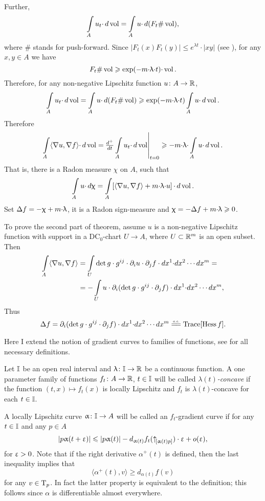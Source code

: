 \documentclass[oneside,a4paper]{article}
\begin{document}
Further,
$$\int\limits_A u_t{\cdot} \,d\mathop{\rm vol}\nolimits=\int\limits_A u{\cdot} \,d(F_t\#\mathop{\rm vol}\nolimits),$$ 
where $\#$ stands for push-forward. 
Since $|F_t(x)F_t(y)|\le e^{\lambda t}{\cdot}|x y|$  
(see \cite[2.1.4(i)]{petrunin:survey}), 
for any $x,y\in A$ we have
$$F_t\#\mathop{\rm vol}\nolimits\geqslant \exp(-m{\cdot}\uplambda{\cdot} t){\cdot}\mathop{\rm vol}\nolimits.$$
Therefore, for any non-negative Lipschitz function $u\colon A\to\mathbb{R}$,
$$\int\limits_A u_t{\cdot}\,d\mathop{\rm vol}\nolimits
=
\int\limits_A u{\cdot}\,d (F_t\#\mathop{\rm vol}\nolimits)
\geqslant
\exp(-m{\cdot}\uplambda{\cdot} t)\int\limits_A u{\cdot}\,d\mathop{\rm vol}\nolimits.$$
Therefore
$$\int\limits_A\langle\nabla u,\nabla f\rangle{\cdot}\,d\mathop{\rm vol}\nolimits 
=
\!\left.\tfrac{d^+}{d t}\int\limits_A u_t{\cdot}\,d\mathop{\rm vol}\nolimits\right|_{t=0}
\geqslant
-m{\cdot}\uplambda{\cdot}\int\limits_A u{\cdot}\,d\mathop{\rm vol}\nolimits.$$
That is, there is a Radon measure $\chi$ on $A$, such that
$$\int\limits_A u{\cdot}\,d\upchi
=
\int\limits_A\!\left[\langle\nabla u,\nabla f\rangle+m{\cdot}\uplambda{\cdot} u\right]{\cdot}\,d\mathop{\rm vol}\nolimits.$$
Set $\Delta f=-\upchi+m{\cdot}\uplambda$, 
it is a Radon sign-measure and $\upchi=-\Delta f+m{\cdot}\uplambda\geqslant 0$.

To prove the second part of theorem,
assume $u$ is a non-negative Lipschitz function with support in a DC$_0$-chart $U\to A$,
where $U\subset \mathbb{R}^m$ is an open subset.
Then 
\begin{align*}
\int\limits_A\langle\nabla u,\nabla f\rangle
&=
\int\limits_U \det g\cdot g^{i j}\cdot\partial_i u\cdot\partial_j f \cdot 
d x^1{\cdot}d x^2\cdots d x^m
=
\\
&=-\int\limits_U u\cdot\partial_i(\det g\cdot g^{i j}\cdot\partial_j f) \cdot d x^1{\cdot}d x^2\cdots d x^m,
\end{align*}
Thus 
$$\Lap f
=
\partial_i(\det g\cdot g^{i j}\cdot\partial_j f)\cdot d x^1{\cdot}d x^2\cdots d x^m
\ae \Trace[\Hess f].$$
\qedsf

 Here I extend the notion of gradient curves to  families of functions, see \cite{petrunin:survey} for all necessary definitions.

Let $\mathbb{I}$ be an open real interval
and $\uplambda\colon\mathbb{I}\to\mathbb{R}$ be a continuous function.
A one parameter family of functions $f_t\colon A\to \mathbb{R}$, $t\in \mathbb{I}$ will be called \emph{$\lambda(t)$-concave} if the function $(t,x)\mapsto f_t(x)$ is locally Lipschitz 
and $f_t$ is $\lambda(t)$-concave for each $t\in \mathbb{I}$.

A locally Lipschitz curve $\upalpha\colon\mathbb{I}\to A$ will be called an $f_t$-gradient curve
if for any $t\in \mathbb{I}$ and any $p\in A$ 
\[|p\upalpha(t+\upvarepsilon)|\leqslant |p\upalpha(t)|-d_{\upalpha(t)}f_t({\uparrow}_{\![{\upalpha(t)}{p}]})\cdot\upvarepsilon+o(\upvarepsilon),\]
for $\upvarepsilon>0$.
Note that if the right derivative $\alpha^+(t)$ is defined, then the last inequality implies that
\[\langle\alpha^+(t),v\rangle\ge d_{\alpha(t)}f(v)\]
for any $v\in\text{\rm T}_p$.
In fact the latter property is equivalent to the definition;
this follows since $\alpha$ is differentiable almost everywhere.
\end{document}
